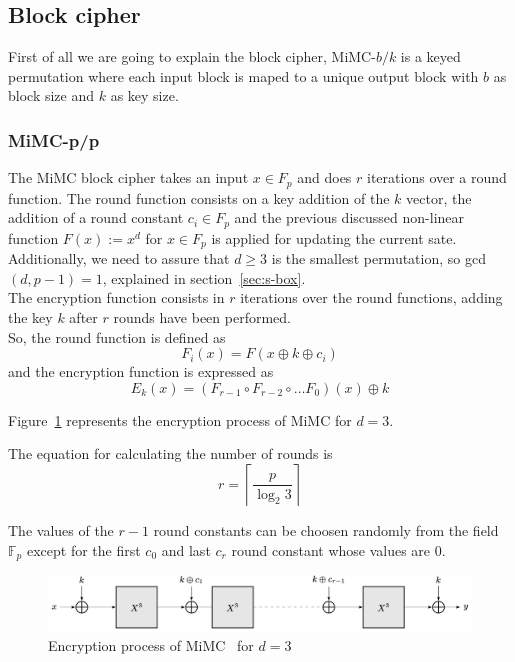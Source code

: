 \subsection*{Block cipher}
First of all we are going to explain the block cipher, MiMC-$b/k$ is a keyed permutation where each input block is maped to a unique output block with $b$ as block size and $k$ as key size.

\subsubsection*{MiMC-p/p}
The MiMC block cipher takes an input $x \in F_{p}$ and does $r$ iterations over a round function. The round function consists on a key addition of the $k$ vector, the addition of a round constant $c_i \in F_{p}$ and the previous discussed non-linear function $F(x) := x^d$ for $x \in F_{p}$ is applied for updating the current sate. Additionally, we need to assure that $d\geq3$ is the smallest
permutation, so gcd$(d,p-1)=1$, explained in section~\ref{sec:s-box}.\\
The encryption function consists in $r$ iterations over the round functions, adding the key $k$ after $r$ rounds have been performed.\\
So, the round function is defined as 
\begin{equation}
    F_i(x) = F\left(x \oplus k \oplus c_i\right)
\end{equation}
and the encryption function is expressed as
\begin{equation}
    E_k(x) = \left(F_{r-1} \circ F_{r-2} \circ \dots F_0\right)(x) \oplus k
\end{equation}

Figure~\ref{fig:mimc-enc-img} represents the encryption process of MiMC for $d=3$.

The equation for calculating the number of rounds is
\begin{equation}
    r = \left\lceil\frac{p}{\log_2 3}\right\rceil
\end{equation}

The values of the $r - 1$ round constants can be choosen randomly from the field $\mathbb{F}_{p}$ except for the first $c_0$ and last $c_r$ round constant whose values are 0.

\begin{figure}[h]
    \centering
    \includegraphics[width=\textwidth]{graphics/enc_mimc.jpg}
    \caption{Encryption process of MiMC~\cite{albrecht2016mimc} for $d=3$}
    \label{fig:mimc-enc-img}
\end{figure}


